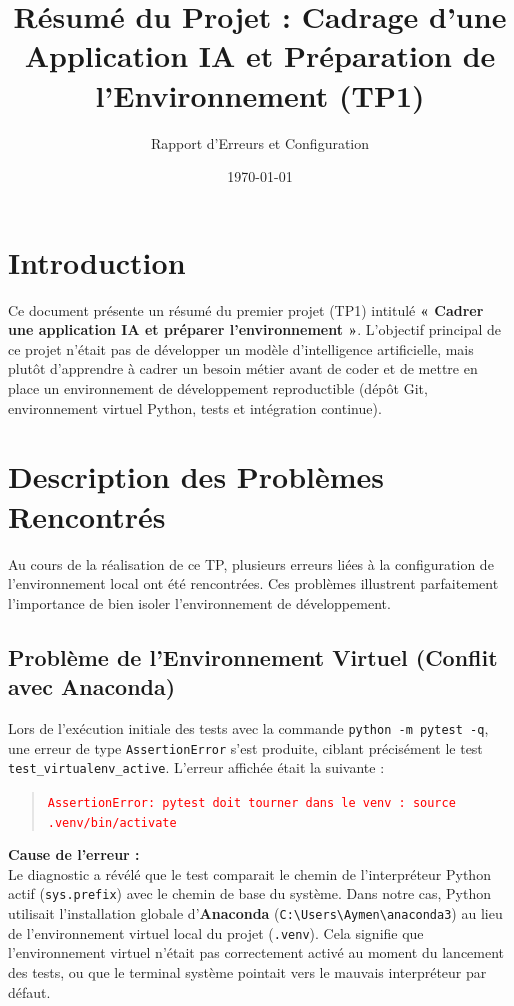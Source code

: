 \documentclass[11pt]{article}
\title{\textbf{Résumé du Projet : Cadrage d'une Application IA et Préparation de l'Environnement (TP1)}}
\author{Rapport d'Erreurs et Configuration}
\date{\today}
\begin{document}
\maketitle

\section{Introduction}
Ce document présente un résumé du premier projet (TP1) intitulé \textbf{« Cadrer une application IA et préparer l'environnement »}. L'objectif principal de ce projet n'était pas de développer un modèle d'intelligence artificielle, mais plutôt d'apprendre à cadrer un besoin métier avant de coder et de mettre en place un environnement de développement reproductible (dépôt Git, environnement virtuel Python, tests et intégration continue).

\section{Description des Problèmes Rencontrés}
Au cours de la réalisation de ce TP, plusieurs erreurs liées à la configuration de l'environnement local ont été rencontrées. Ces problèmes illustrent parfaitement l'importance de bien isoler l'environnement de développement.

\subsection{Problème de l'Environnement Virtuel (Conflit avec Anaconda)}
Lors de l'exécution initiale des tests avec la commande \texttt{python -m pytest -q}, une erreur de type \texttt{AssertionError} s'est produite, ciblant précisément le test \texttt{test\_virtualenv\_active}. L'erreur affichée était la suivante : 
\begin{quote}
    \textcolor{red}{\texttt{AssertionError: pytest doit tourner dans le venv : source .venv/bin/activate}}
\end{quote}

\textbf{Cause de l'erreur :} \\
Le diagnostic a révélé que le test comparait le chemin de l'interpréteur Python actif (\texttt{sys.prefix}) avec le chemin de base du système. Dans notre cas, Python utilisait l'installation globale d'\textbf{Anaconda} (\texttt{C:\textbackslash Users\textbackslash Aymen\textbackslash anaconda3}) au lieu de l'environnement virtuel local du projet (\texttt{.venv}). Cela signifie que l'environnement virtuel n'était pas correctement activé au moment du lancement des tests, ou que le terminal système pointait vers le mauvais interpréteur par défaut.
\end{document}
